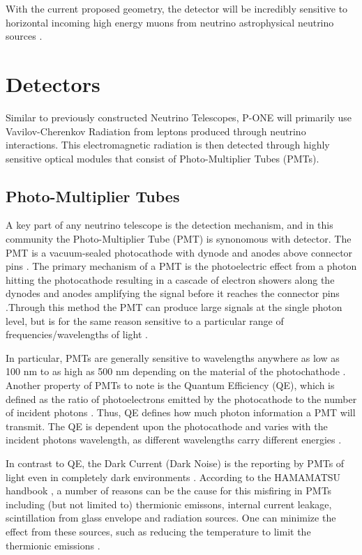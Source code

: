 With the current proposed geometry, the detector will be incredibly sensitive to horizontal incoming high energy muons from neutrino astrophysical neutrino sources \cite{pone}. 

\section{Detectors}
Similar to previously constructed Neutrino Telescopes, P-ONE will primarily use Vavilov-Cherenkov Radiation from leptons produced through neutrino interactions. This electromagnetic radiation is then detected through highly sensitive optical modules that consist of Photo-Multiplier Tubes (PMTs).

\subsection{Photo-Multiplier Tubes}

A key part of any neutrino telescope is the detection mechanism, and in this community the Photo-Multiplier Tube (PMT) is synonomous with detector. The PMT is a vacuum-sealed photocathode with dynode and anodes above connector pins \cite{ham}. The primary mechanism of a PMT is the photoelectric effect from a photon hitting the photocathode resulting in a cascade of electron showers along the dynodes and anodes amplifying the signal before it reaches the connector pins \cite{pmt_hist}.Through this method the PMT can produce large signals at the single photon level, but is for the same reason sensitive to a particular range of frequencies/wavelengths of light \cite{pmt_hist}.

In particular, PMTs are generally sensitive to wavelengths anywhere as low as 100 nm to as high as 500 nm depending on the material of the photochathode \cite{ham}. Another property of PMTs to note is the Quantum Efficiency (QE), which is defined as the ratio of photoelectrons emitted by the photocathode to the number of incident photons \cite{ham}. Thus, QE defines how much photon information a PMT will transmit. The QE is dependent upon the photocathode and varies with the incident photons wavelength, as different wavelengths carry different energies \cite{ham}.

In contrast to QE, the Dark Current (Dark Noise) is the reporting by PMTs of light even in completely dark environments \cite{ham}. According to the HAMAMATSU handbook \cite{ham}, a number of reasons can be the cause for this misfiring in PMTs including (but not limited to) thermionic emissons, internal current leakage, scintillation from glass envelope and radiation sources. One can minimize the effect from these sources, such as reducing the temperature to limit the thermionic emissions \cite{ham}.

